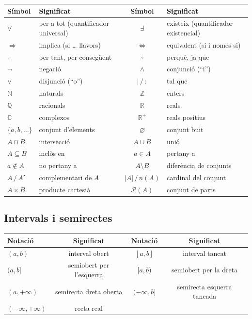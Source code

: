 \begin{table}[H]
\centering
\renewcommand{\arraystretch}{1.25}
\begin{tabularx}{\textwidth}{l>{\raggedright\arraybackslash}Xc>{\raggedright\arraybackslash}X}
\toprule
Símbol & Significat & Símbol & Significat \\
\midrule
$\forall$ & per a tot (quantificador universal) & $\exists$ & existeix (quantificador existencial) \\
$\Rightarrow$ & implica (si \ldots{} llavors) & $\Leftrightarrow$ & equivalent (si i només si) \\
$\therefore$ & per tant, per consegüent & $\because$ & perquè, ja que \\
$\neg$ & negació & $\wedge$ & conjunció (``i'') \\
$\vee$ & disjunció (``o'') & $\mid\,/\,:$ & tal que \\
$\mathbb{N}$ & naturals & $\mathbb{Z}$ & enters \\
$\mathbb{Q}$ & racionals & $\mathbb{R}$ & reals \\
$\mathbb{C}$ & complexos & $\mathbb{R}^+$ & reals positius \\
$\{a, b, \ldots\}$ & conjunt d'elements & $\varnothing$ & conjunt buit \\
$A\cap B$ & intersecció & $A\cup B$ & unió \\
$A\subseteq B$ & inclòs en & $a\in A$ & pertany a \\
$a\notin A$ & no pertany a & $A\setminus B$ & diferència de conjunts \\
$\overline{A}\,/\,A'$ & complementari de $A$ & $\lvert A\rvert\,/\,n(A)$ & cardinal del conjunt \\
$A\times B$ & producte cartesià & $\mathcal{P}(A)$ & conjunt de parts \\
\bottomrule
\end{tabularx}
\end{table}

\subsection*{Intervals i semirectes}

\begin{table}[H]
\centering
\renewcommand{\arraystretch}{1.25}
\begin{tabular}{lccc}
\toprule
Notació & Significat & Notació & Significat \\
\midrule
$(a, b)$ & interval obert & $[a, b]$ & interval tancat \\
$(a, b]$ & semiobert per l'esquerra & $[a, b)$ & semiobert per la dreta \\
$(a, +\infty)$ & semirecta dreta oberta & $(-\infty, b]$ & semirecta esquerra tancada \\
$(-\infty, +\infty)$ & recta real &  &  \\
\bottomrule
\end{tabular}
\end{table}

